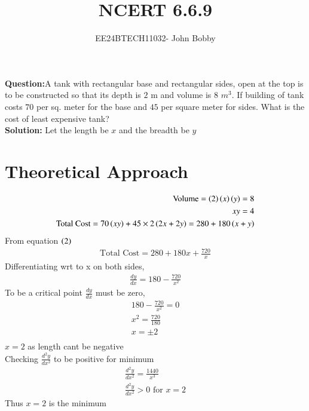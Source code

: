 \documentclass[journal,12pt,onecolumn]{IEEEtran}
\theoremstyle{remark}
\begin{document}

\vspace{3cm}

\title{\textbf{NCERT 6.6.9}}
\author{EE24BTECH11032- John Bobby}
\maketitle
\bigskip
\textbf{Question:}A tank with rectangular base and rectangular sides, open at the top is to be constructed so that its depth is $2$ m and volume is $8$ $m^3$. If building of tank costs  $70$ per sq. meter for the base and  $45$ per square meter for sides. What is the cost of least expensive tank?\\

\textbf{Solution:} Let the length be $x$ and the breadth be $y$\\
\section{Theoretical Approach}
\begin{align}
    \text{Volume}=\left(2\right)\left(x\right)\left(y\right)=8\\
    xy=4\\
    \text{Total Cost}=70\left(xy\right)+45\times2\left(2x+2y\right)=280+180\left(x+y\right)
\end{align}
From equation $\left(2\right)$
\begin{align}
    \text{Total Cost}=280+180x+\frac{720}{x}
\end{align}
Differentiating wrt to x on both sides,
\begin{align}
    \frac{dy}{dx}=180-\frac{720}{x^2}
\end{align}
To be a critical point $\frac{dy}{dx}$  must be zero,
\begin{align}
    180-\frac{720}{x^2}=0\\
    x^2=\frac{720}{180}\\
    x=\pm 2\\
\end{align}
$x=2$ as length cant be negative\\
Checking $\frac{d^2y}{dx^2}$ to be positive for minimum
\begin{align}
    \frac{d^2y}{dx^2}=\frac{1440}{x^3}\\
    \frac{d^2y}{dx^2} >0\text{ for }  x=2
\end{align}
Thus $x=2$ is the minimum
\end{document}
